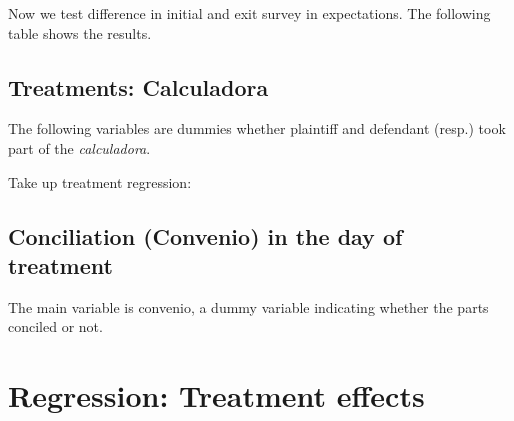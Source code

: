 \documentclass[12pt]{article}
\theoremstyle{named}
\newcommand{\folder}{C:/Users/chasi_000/Dropbox/Statistics/P10/Results/Results_2/Effect}
\begin{document}
\pagebreak

Now we test difference in initial and exit survey in expectations. The following table shows the results.

\begin{center}
\scriptsize{}
\end{center}


\pagebreak

\subsection*{Treatments: Calculadora}

The following variables are dummies whether plaintiff and defendant (resp.) took part of the \emph{calculadora}.\\

\begin{center}
\scriptsize{}
\end{center}

\pagebreak

Take up treatment regression:

\begin{center}
\scriptsize{}
\end{center}

\pagebreak



\subsection*{Conciliation (Convenio) in the day of treatment}

The main variable is convenio, a dummy variable indicating whether the parts conciled or not.\\

\begin{center}
\scriptsize{}
\end{center}

\begin{center}
\scriptsize{}
\end{center}


\vspace{5mm}


\pagebreak


\vspace{5mm}

\section{\Huge{Regression: Treatment effects}}
\end{document}
